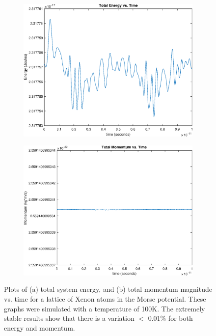 \documentclass[12pt]{article}
\begin{document}
\begin{figure}[!h]
\begin{subfigure}{0.5\textwidth}
\includegraphics[width=0.9\linewidth]{./finalpics/MEvsT.eps}
\caption{\label{MEconservation}}
\end{subfigure}
\begin{subfigure}{0.5\textwidth}
\includegraphics[width=0.9\linewidth]{./finalpics/MPvsT.eps}
\caption{\label{MPconservation}}
\end{subfigure}
\caption{Plots of (a) total system energy, and (b) total momentum magnitude vs. time for a lattice of Xenon atoms in the Morse potential.  These graphs were simulated with a temperature of 100K.  The extremely stable results show that there is a variation $<$ 0.01\% for both energy and momentum.} 
\end{figure}
\end{document}
